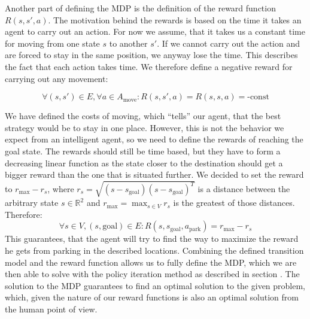     Another part of defining the MDP is the definition of the reward function
    $R(s,s',a)$. The motivation behind the rewards is based on the time it
    takes an agent to carry out an action. For now we assume, that it takes us
    a constant time for moving from one state $s$ to another $s'$. If we
    cannot carry out the action and are forced to stay in the same position,
    we anyway lose the time. This describes the fact that each action takes
    time. We therefore define a negative reward for carrying out any movement:

    \begin{equation}
        \forall (s, s') \in E, \forall a \in A_{\mbox{move}}: R(s, s', a) = R(s, s, a) = \mbox{-const}
    \end{equation}

    We have defined the costs of moving, which ``tells'' our agent, that the best strategy would be to stay in one place. However, this is not the behavior we expect from an intelligent agent, so we need to define the rewards of reaching the goal state. The rewards should still be time based, but they have to form a decreasing linear function as the state closer to the destination should get a bigger reward than the one that is situated further. We decided to set the reward to $r_{\max} - r_s$, where $r_s = \sqrt{(s - s_{\mbox{goal}}) {(s - s_{\mbox{goal}})}^T}$ is a distance between the arbitrary state $s \in \mathbb{R}^2$ and $r_{\max} = \max_{s \in V}r_s$ is the greatest of those distances. Therefore:
    \begin{equation}
        \forall s \in V, (s,\mbox{goal}) \in E : R(s, s_{\mbox{goal}}, a_{\mbox{park}}) = r_{\max} - r_s
    \end{equation}
    This guarantees, that the agent will try to find the way to maximize the reward he gets from parking in the described locations.
    Combining the defined transition model and the reward function allows us to fully define the MDP, which we are then able to solve with the policy iteration method as described in section . The solution to the MDP guarantees to find an optimal solution to the given problem, which, given the nature of our reward functions is also an optimal solution from the human point of view.

